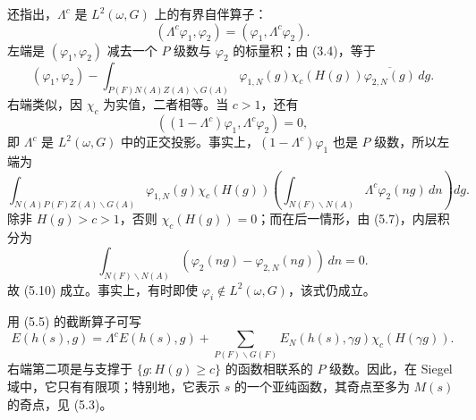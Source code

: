 还指出，$\Lambda^c$ 是 $L^2(\omega,G)$ 上的有界自伴算子：
\begin{equation}
 (\Lambda^c\varphi_1,\varphi_2)=(\varphi_1,\Lambda^c\varphi_2).\tag{5.9}
\end{equation}
左端是 $(\varphi_1,\varphi_2)$ 减去一个 $P$ 级数与 $\varphi_2$ 的标量积；由 (3.4)，等于
\[
 (\varphi_1,\varphi_2)-\int_{P(F)N(A)Z(A)\backslash G(A)}
 \varphi_{1,N}(g)\chi_c(H(g))\overline{\varphi_{2,N}(g)}\,dg.
\]
右端类似，因 $\chi_c$ 为实值，二者相等。当 $c>1$，还有
\begin{equation}
 ((1-\Lambda^c)\varphi_1,\Lambda^c\varphi_2)=0,\tag{5.10}
\end{equation}
即 $\Lambda^c$ 是 $L^2(\omega,G)$ 中的正交投影。事实上，$(1-\Lambda^c)\varphi_1$ 也是
$P$ 级数，所以左端为
\[
 \int_{N(A)P(F)Z(A)\backslash G(A)}\varphi_{1,N}(g)\chi_c(H(g))
 \left(\int_{N(F)\backslash N(A)}\Lambda^c\varphi_2(ng)\,dn\right)dg.
\]
除非 $H(g)>c>1$，否则 $\chi_c(H(g))=0$；而在后一情形，由 (5.7)，内层积分为
\[
 \int_{N(F)\backslash N(A)}(\varphi_2(ng)-\varphi_{2,N}(ng))\,dn=0.
\]
故 (5.10) 成立。事实上，有时即使 $\varphi_i\notin L^2(\omega,G)$，该式仍成立。

用 (5.5) 的截断算子可写
\begin{equation}
 E(h(s),g)=\Lambda^cE(h(s),g)
 +\sum_{P(F)\backslash G(F)}E_N(h(s),\gamma g)\chi_c(H(\gamma g)).\tag{5.11}
\end{equation}
右端第二项是与支撑于 $\{g:H(g)\ge c\}$ 的函数相联系的 $P$ 级数。因此，在 Siegel 域中，它只有有限项；特别地，它表示 $s$ 的一个亚纯函数，其奇点至多为 $M(s)$ 的奇点，见 (5.3)。


